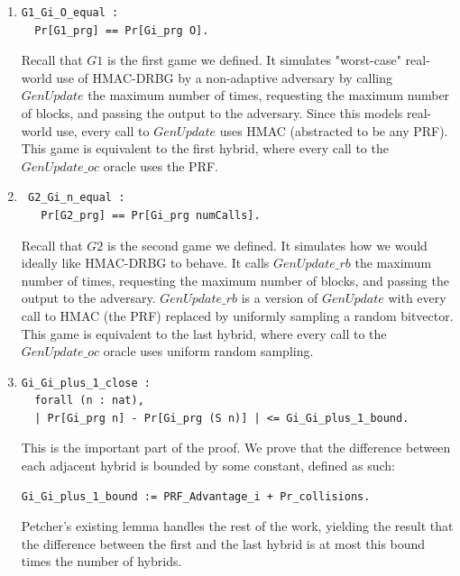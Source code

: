 \documentclass[12pt,lot, lof]{puthesis}
\begin{document}
{\begin{enumerate}
\par
\item \begin{lstlisting}
G1_Gi_O_equal :
  Pr[G1_prg] == Pr[Gi_prg O].
\end{lstlisting}   

Recall that $G1$ is the first game we defined. It simulates "worst-case" real-world use of HMAC-DRBG by a non-adaptive adversary by calling $GenUpdate$ the maximum number of times, requesting the maximum number of blocks, and passing the output to the adversary. Since this models real-world use, every call to $GenUpdate$ uses HMAC (abstracted to be any PRF). This game is equivalent to the first hybrid, where every call to the $GenUpdate\_oc$ oracle uses the PRF.

\par
\item \begin{lstlisting}
 G2_Gi_n_equal :
   Pr[G2_prg] == Pr[Gi_prg numCalls].
  \end{lstlisting}

Recall that $G2$ is the second game we defined. It simulates how we would ideally like HMAC-DRBG to behave. It calls $GenUpdate\_rb$ the maximum number of times, requesting the maximum number of blocks, and passing the output to the adversary. $GenUpdate\_rb$ is a version of $GenUpdate$ with every call to HMAC (the PRF) replaced by uniformly sampling a random bitvector. This game is equivalent to the last hybrid, where every call to the $GenUpdate\_oc$ oracle uses uniform random sampling.

\par 
\item \begin{lstlisting}
Gi_Gi_plus_1_close :
  forall (n : nat),
  | Pr[Gi_prg n] - Pr[Gi_prg (S n)] | <= Gi_Gi_plus_1_bound.
  \end{lstlisting}

This is the important part of the proof. We prove that the difference between each adjacent hybrid is bounded by some constant, defined as such:

\begin{lstlisting}
Gi_Gi_plus_1_bound := PRF_Advantage_i + Pr_collisions.
\end{lstlisting}

Petcher's existing lemma handles the rest of the work, yielding the result that the difference between the first and the last hybrid is at most this bound times the number of hybrids.


\end{enumerate}}
\end{document}
